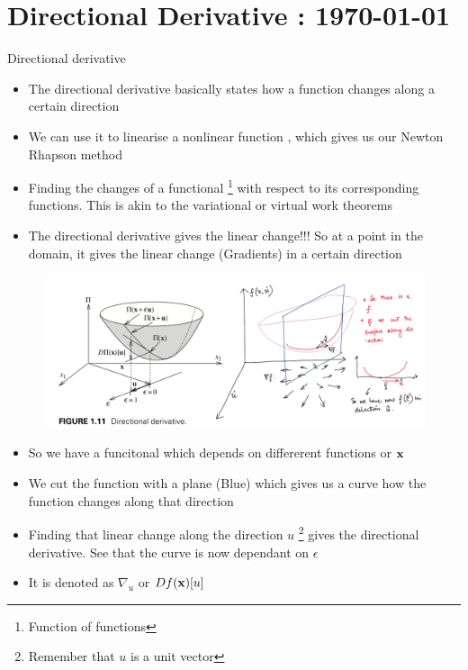 




\tableofcontents

\section{Directional Derivative : \today}
	\begin{frame}{Directional derivative}
		\begin{itemize}
			\item The directional derivative basically states how a function changes along a certain direction
			\item We can use it to linearise a nonlinear function , which gives us our Newton Rhapson method
			\item Finding the changes of a functional \footnote{Function of functions} with respect to its corresponding functions. This is akin to the variational or virtual work theorems
			\item The directional derivative gives the linear change!!! So at a point in the domain, it gives the linear change (Gradients) in a certain direction
			
		\end{itemize}
	\end{frame}


	\begin{frame}
		\begin{figure}
			\centering
			\includegraphics[width=1\linewidth]{Figure/fig1}
			\label{fig:fig3}
		\end{figure}
		\begin{itemize}
			\item So we have a funcitonal which depends on differerent functions or $\mathbf{x}$
			\item We cut the function with a plane (Blue) which gives us a curve how the function changes along that direction
			\item Finding that linear change along the direction ${u}$ \footnote{Remember that $u$ is a unit vector} gives the directional derivative. See that the curve is now dependant on $\epsilon$
			
			\item It is denoted as $\nabla_u$ or $D f(\mathbf{x})[u]$
			
		\end{itemize}
	\end{frame}

